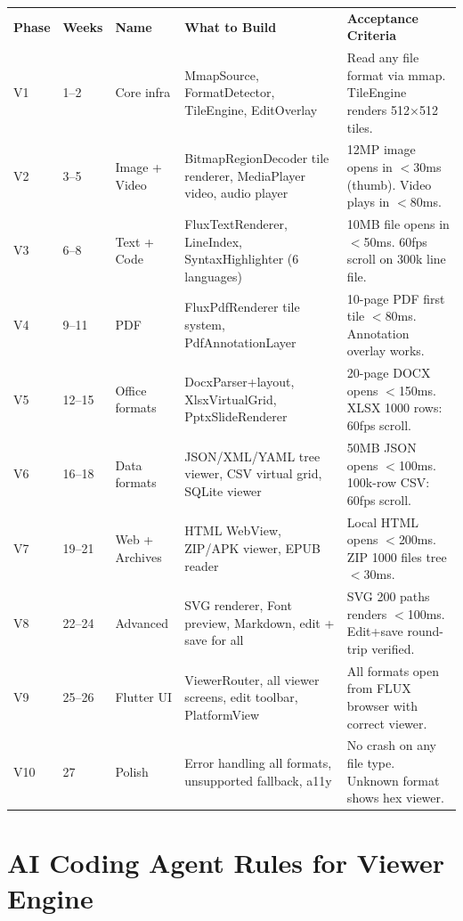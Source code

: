 \documentclass[12pt,a4paper]{report}
\newcommand{\ra}[1]{\renewcommand{\arraystretch}{#1}}
\newcommand{\THO}[1]{\rowcolor{OR}\color{white}\bfseries #1}
\begin{document}
\begin{center}\ra{1.4}
\begin{tabular}{C{1.2cm} L{2.2cm} L{2.8cm} L{5.2cm} L{3.4cm}}
\THO{Phase} & \THO{Weeks} & \THO{Name} & \THO{What to Build} & \THO{Acceptance Criteria} \\
 V1 & 1--2 & Core infra & MmapSource, FormatDetector, TileEngine, EditOverlay &
  Read any file format via mmap. TileEngine renders 512×512 tiles. \\
 V2 & 3--5 & Image + Video & BitmapRegionDecoder tile renderer, MediaPlayer video, audio player &
  12MP image opens in $<$30ms (thumb). Video plays in $<$80ms. \\
 V3 & 6--8 & Text + Code & FluxTextRenderer, LineIndex, SyntaxHighlighter (6 languages) &
  10MB file opens in $<$50ms. 60fps scroll on 300k line file. \\
 V4 & 9--11 & PDF & FluxPdfRenderer tile system, PdfAnnotationLayer &
  10-page PDF first tile $<$80ms. Annotation overlay works. \\
 V5 & 12--15 & Office formats & DocxParser+layout, XlsxVirtualGrid, PptxSlideRenderer &
  20-page DOCX opens $<$150ms. XLSX 1000 rows: 60fps scroll. \\
 V6 & 16--18 & Data formats & JSON/XML/YAML tree viewer, CSV virtual grid, SQLite viewer &
  50MB JSON opens $<$100ms. 100k-row CSV: 60fps scroll. \\
 V7 & 19--21 & Web + Archives & HTML WebView, ZIP/APK viewer, EPUB reader &
  Local HTML opens $<$200ms. ZIP 1000 files tree $<$30ms. \\
 V8 & 22--24 & Advanced & SVG renderer, Font preview, Markdown, edit + save for all &
  SVG 200 paths renders $<$100ms. Edit+save round-trip verified. \\
 V9 & 25--26 & Flutter UI & ViewerRouter, all viewer screens, edit toolbar, PlatformView &
  All formats open from FLUX browser with correct viewer. \\
 V10 & 27 & Polish & Error handling all formats, unsupported fallback, a11y &
  No crash on any file type. Unknown format shows hex viewer. \\
\end{tabular}
\end{center}

\section{AI Coding Agent Rules for Viewer Engine}
\end{document}

